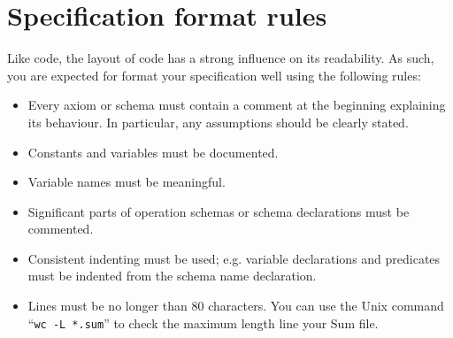 \section{Specification format rules}
\label{app:spec-format-rules}

Like code,  the layout of code has a strong influence on its readability. As such, you are expected for format your specification well using the following rules:

\begin{itemize}

\item Every axiom or schema must contain a comment at the beginning explaining its behaviour. In particular, any assumptions should be clearly stated.

\item Constants and variables must be documented.

\item Variable names must be meaningful.

\item Significant parts of operation schemas or schema declarations must be commented.

\item Consistent indenting must be used; e.g. variable declarations and predicates must be indented from the schema name declaration.  

\item Lines must be no longer than 80 characters. You can use the Unix command ``\texttt{wc -L *.sum}'' to check the maximum length line your Sum file.

\end{itemize} 

